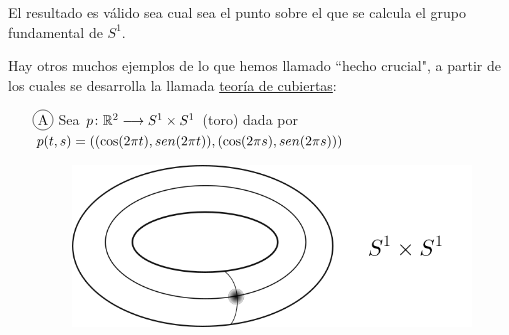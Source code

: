 \documentclass[GTS.tex]{subfiles}
\begin{document}
\vspace{0.2cm}

\begin{nota}
El resultado es válido sea cual sea el punto sobre el que se calcula el grupo fundamental de $S^1$.
\end{nota}


\begin{nota}
Hay otros muchos ejemplos de lo que hemos llamado ``hecho crucial", a partir de los cuales se desarrolla la llamada \underline{teoría de cubiertas}:
\begin{itemize}
\item[$\circled{A}$] Sea $p\colon{\mathbb{R}^2}\longrightarrow{S^1\times S^1}$ (toro) dada por $p(t,s)=((\cos(2\pi t), sen (2\pi t)),(\cos(2\pi s), sen (2\pi s)))$
\begin{figure}[h!]
	\includegraphics[scale=0.5]{path4172}
\end{figure}


\end{itemize}
\end{nota}
\end{document}

